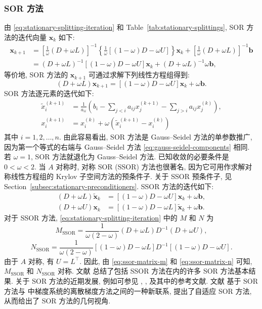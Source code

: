 \subsubsection{{SOR 方法}}\label{subsec:sor-method}
{由 \eqref{eq:stationary-splitting-iteration} 和 Table~\ref{tab:stationary-splittings}, SOR 方法的迭代向量 $\bm x_k$ 如下:}
\[
\begin{aligned}
\bm x_{k+1}&=\left[\frac1\omega(D+\omega L)\right]^{-1}
\left\{\frac1\omega[(1-\omega)D-\omega U]\right\}\bm x_k+
\left[\frac1\omega(D+\omega L)\right]^{-1}\bm b\\
&=(D+\omega L)^{-1}[(1-\omega)D-\omega U]\bm x_k+(D+\omega L)^{-1}\omega\bm b,
\end{aligned}
\]
{等价地, SOR 方法的 $\bm x_{k+1}$ 可通过求解下列线性方程组得到:}
\[(D+\omega L)\bm x_{k+1}=[(1-\omega)D-\omega U]\bm x_k+\omega\bm b.\]
{SOR 方法逐元素的迭代如下:}
\[
\begin{aligned}
\tilde x_i^{(k+1)}&=\frac1{a_{ii}}\left(b_i-\sum_{j<i}a_{ij}x_j^{(k+1)}-\sum_{j>i}a_{ij}x_j^{(k)}\right),\\
x_i^{(k+1)}&=x_i^{(k)}+\omega(\tilde x_i^{(k+1)}-x_i^{(k)})
\end{aligned}
\]
{其中 $i=1,2,\ldots,n$. 由此容易看出, SOR 方法是 Gauss--Seidel 方法的单参数推广, 因为第一个等式的右端与 Gauss--Seidel 方法 \eqref{eq:gauss-seidel-components} 相同. 若 $\omega=1$, SOR 方法就退化为 Gauss--Seidel 方法. 已知收敛的必要条件是 $0<\omega<2$.}
{当 $A$ 对称时, 对称 SOR (SSOR) 方法也很著名, 因为它可用作求解对称线性方程组的 Krylov 子空间方法的预条件子. 关于 SSOR 预条件子, 见 Section~\ref{subsec:stationary-preconditioners}. SSOR 方法的迭代如下:}
\[
\begin{aligned}
(D+\omega L)\tilde{\bm x}_k&=[(1-\omega)D-\omega U]\bm x_k+\omega\bm b,\\
(D+\omega U)\bm x_k&=[(1-\omega)D-\omega L]\tilde{\bm x}_k+\omega\bm b.
\end{aligned}
\]
{对于 SSOR 方法, \eqref{eq:stationary-splitting-iteration} 中的 $M$ 和 $N$ 为}
\begin{equation}\label{eq:ssor-matrix-m}
M_{\mathrm{SSOR}}=\frac1{\omega(2-\omega)}(D+\omega L)D^{-1}(D+\omega U),
\end{equation}
\begin{equation}\label{eq:ssor-matrix-n}
N_{\mathrm{SSOR}}=\frac1{\omega(2-\omega)}[(1-\omega)D-\omega L]D^{-1}[(1-\omega)D-\omega U].
\end{equation}
{由于 $A$ 对称, 有 $U=L^\top$. 因此, 由 \eqref{eq:ssor-matrix-m} 和 \eqref{eq:ssor-matrix-n} 可知, $M_{\mathrm{SSOR}}$ 和 $N_{\mathrm{SSOR}}$ 对称.}
{文献  总结了包括 SSOR 方法在内的许多 SOR 方法基本结果. 关于 SOR 方法的近期发展, 例如可参见 , ,  及其中的参考文献. 文献  基于 SOR 方法与  中梯度系统的离散梯度方法之间的一种新联系, 提出了自适应 SOR 方法, 从而给出了 SOR 方法的几何视角.}
